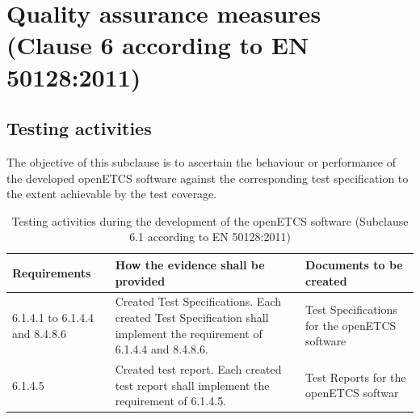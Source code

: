 \documentclass{template/openetcs_report}
\begin{document}
\section{Quality assurance measures (Clause 6 according to EN 50128:2011)}
\label{clause62}
\subsection{Testing activities}
\begin{flushleft}
The objective of this subclause is to ascertain the behaviour or performance of the developed openETCS software against the corresponding test specification to the extent achievable by the test coverage.
\end{flushleft}
{\footnotesize\sffamily\centering
\begin{longtable}{|p{2cm}|p{9cm}|p{3cm}|}
\caption{Testing activities during the development of the openETCS software (Subclause 6.1 according to EN 50128:2011)}\\
\hline
\bfseries Requirements & \bfseries How the evidence shall be provided & \bfseries Documents to be created\\
\hline
\hline
\endhead
\hline
\endfoot

6.1.4.1 to 6.1.4.4 and 8.4.8.6 & Created Test Specifications. 
Each created Test Specification shall implement the requirement of 6.1.4.4 and 8.4.8.6.
& Test Specifications for the openETCS software\\ 
\hline
6.1.4.5 & Created test report. Each created test report shall implement the requirement of 6.1.4.5.
& Test Reports for the openETCS softwar\\ 
\hline
\end{longtable}}
\end{document}
